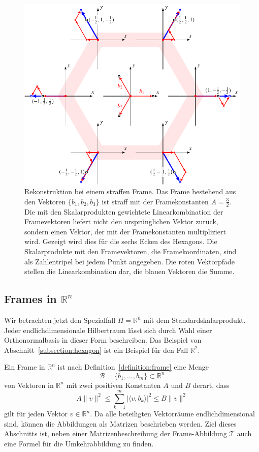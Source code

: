 \begin{figure}
\centering
\includegraphics{chapters/1-geometrie/images/hexagon3.pdf}
\caption{Rekonstruktion bei einem straffen Frame.
Das Frame bestehend aus den Vektoren $\{b_1,b_2,b_3\}$ ist straff
mit der Framekonstanten $A=\frac32$.
Die mit den Skalarprodukten gewichtete Linearkombination der
Framevektoren liefert nicht den ursprünglichen Vektor zurück, sondern
einen Vektor, der mit der Framekonstanten multipliziert wird.
Gezeigt wird dies für die sechs Ecken des Hexagons.
Die Skalarprodukte mit den Framevektoren, die Framekoordinaten, sind
als Zahlentripel bei jedem Punkt angegeben.
Die roten Vektorpfade stellen die Linearkombination dar, die blauen
Vektoren die Summe.
\label{geometrie:hexagon:rekonstruktion}}
\end{figure}

%
%
\subsection{Frames in $\mathbb R^n$
\label{subsetion:skript:frames:framesinrn}}
Wir betrachten jetzt den Spezialfall $H=\mathbb{R}^n$ mit dem
Standardskalarprodukt.
Jeder endlichdimensionale Hilbertraum lässt sich durch Wahl einer
Orthonormalbasis in dieser Form beschreiben.
Das Beispiel von Abschnitt~\ref{subsection:hexagon} ist ein Beispiel für
den Fall $\mathbb R^2$.

Ein Frame in $\mathbb R^n$ ist nach Definition~\ref{definition:frame}
eine Menge 
\[
\mathcal{B}
=
\{b_1,\dots,b_m\}
\subset
\mathbb R^n
\]
von Vektoren in $\mathbb R^n$ mit zwei positiven Konstanten $A$ und $B$
derart, dass
\[
A\|v\|^2
\le
\sum_{k=1}^m |\langle v,b_k\rangle|^2
\le
B\|v\|^2
\]
gilt für jeden Vektor $v\in\mathbb R^n$.
Da alle beteiligten Vektorräume endlichdimensional sind, können
die Abbildungen als Matrizen beschrieben werden.
Ziel dieses Abschnitts ist, neben einer Matrizenbeschreibung
der Frame-Abbildung $\mathcal{T}$ auch eine Formel für die
Umkehrabbildung zu finden.


